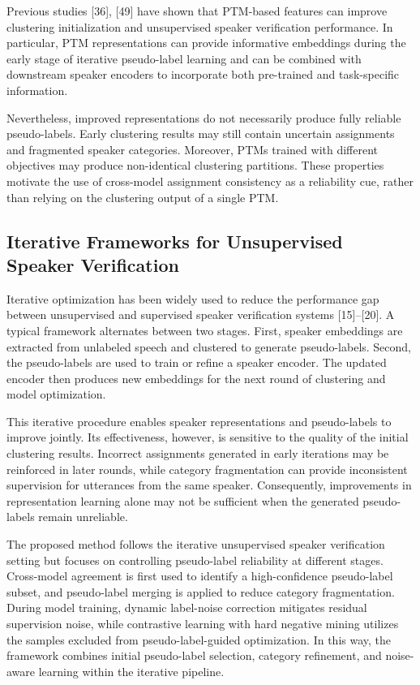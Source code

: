 \documentclass[lettersize,journal]{IEEEtran}
\begin{document}
Previous studies [36], [49] have shown that PTM-based features can
improve clustering initialization and unsupervised speaker
verification performance. In particular, PTM representations can
provide informative embeddings during the early stage of iterative
pseudo-label learning and can be combined with downstream speaker
encoders to incorporate both pre-trained and task-specific
information.

Nevertheless, improved representations do not necessarily produce
fully reliable pseudo-labels. Early clustering results may still
contain uncertain assignments and fragmented speaker categories.
Moreover, PTMs trained with different objectives may produce
non-identical clustering partitions. These properties motivate the
use of cross-model assignment consistency as a reliability cue,
rather than relying on the clustering output of a single PTM.

\subsection{Iterative Frameworks for Unsupervised Speaker Verification}

Iterative optimization has been widely used to reduce the performance
gap between unsupervised and supervised speaker verification
systems [15]--[20]. A typical framework alternates between two
stages. First, speaker embeddings are extracted from unlabeled speech
and clustered to generate pseudo-labels. Second, the pseudo-labels
are used to train or refine a speaker encoder. The updated encoder
then produces new embeddings for the next round of clustering and
model optimization.

This iterative procedure enables speaker representations and
pseudo-labels to improve jointly. Its effectiveness, however, is
sensitive to the quality of the initial clustering results.
Incorrect assignments generated in early iterations may be
reinforced in later rounds, while category fragmentation can provide
inconsistent supervision for utterances from the same speaker.
Consequently, improvements in representation learning alone may not
be sufficient when the generated pseudo-labels remain unreliable.

The proposed method follows the iterative unsupervised speaker
verification setting but focuses on controlling pseudo-label
reliability at different stages. Cross-model agreement is first used
to identify a high-confidence pseudo-label subset, and pseudo-label
merging is applied to reduce category fragmentation. During model
training, dynamic label-noise correction mitigates residual
supervision noise, while contrastive learning with hard negative
mining utilizes the samples excluded from pseudo-label-guided
optimization. In this way, the framework combines initial
pseudo-label selection, category refinement, and noise-aware learning
within the iterative pipeline.
\end{document}
